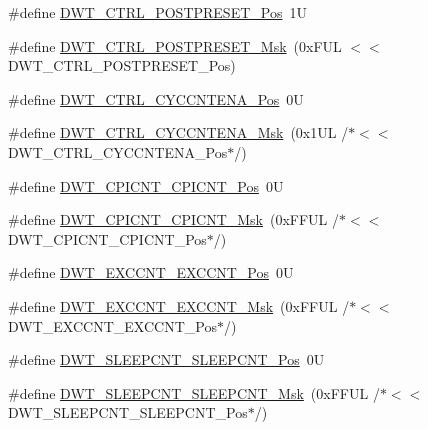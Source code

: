 \begin{DoxyCompactItemize}
\item 
\#define \hyperlink{group___c_m_s_i_s___d_w_t_ga129bc152febfddd67a0c20c6814cba69}{D\-W\-T\-\_\-\-C\-T\-R\-L\-\_\-\-P\-O\-S\-T\-P\-R\-E\-S\-E\-T\-\_\-\-Pos}~1\-U
\item 
\#define \hyperlink{group___c_m_s_i_s___d_w_t_ga11d9e1e2a758fdd2657aa68ce61b9c9d}{D\-W\-T\-\_\-\-C\-T\-R\-L\-\_\-\-P\-O\-S\-T\-P\-R\-E\-S\-E\-T\-\_\-\-Msk}~(0x\-F\-U\-L $<$$<$ D\-W\-T\-\_\-\-C\-T\-R\-L\-\_\-\-P\-O\-S\-T\-P\-R\-E\-S\-E\-T\-\_\-\-Pos)
\item 
\#define \hyperlink{group___c_m_s_i_s___d_w_t_gaa4509f5f8514a7200be61691f0e01f10}{D\-W\-T\-\_\-\-C\-T\-R\-L\-\_\-\-C\-Y\-C\-C\-N\-T\-E\-N\-A\-\_\-\-Pos}~0\-U
\item 
\#define \hyperlink{group___c_m_s_i_s___d_w_t_ga4a9d209dc2a81ea6bfa0ea21331769d3}{D\-W\-T\-\_\-\-C\-T\-R\-L\-\_\-\-C\-Y\-C\-C\-N\-T\-E\-N\-A\-\_\-\-Msk}~(0x1\-U\-L /$\ast$$<$$<$ D\-W\-T\-\_\-\-C\-T\-R\-L\-\_\-\-C\-Y\-C\-C\-N\-T\-E\-N\-A\-\_\-\-Pos$\ast$/)
\item 
\#define \hyperlink{group___c_m_s_i_s___d_w_t_ga80e9ad8f6a9e2344af8a3cf989bebe3d}{D\-W\-T\-\_\-\-C\-P\-I\-C\-N\-T\-\_\-\-C\-P\-I\-C\-N\-T\-\_\-\-Pos}~0\-U
\item 
\#define \hyperlink{group___c_m_s_i_s___d_w_t_ga76f39e7bca3fa86a4dbf7b8f6adb7217}{D\-W\-T\-\_\-\-C\-P\-I\-C\-N\-T\-\_\-\-C\-P\-I\-C\-N\-T\-\_\-\-Msk}~(0x\-F\-F\-U\-L /$\ast$$<$$<$ D\-W\-T\-\_\-\-C\-P\-I\-C\-N\-T\-\_\-\-C\-P\-I\-C\-N\-T\-\_\-\-Pos$\ast$/)
\item 
\#define \hyperlink{group___c_m_s_i_s___d_w_t_ga031c693654030d4cba398b45d2925b1d}{D\-W\-T\-\_\-\-E\-X\-C\-C\-N\-T\-\_\-\-E\-X\-C\-C\-N\-T\-\_\-\-Pos}~0\-U
\item 
\#define \hyperlink{group___c_m_s_i_s___d_w_t_ga057fa604a107b58a198bbbadb47e69c9}{D\-W\-T\-\_\-\-E\-X\-C\-C\-N\-T\-\_\-\-E\-X\-C\-C\-N\-T\-\_\-\-Msk}~(0x\-F\-F\-U\-L /$\ast$$<$$<$ D\-W\-T\-\_\-\-E\-X\-C\-C\-N\-T\-\_\-\-E\-X\-C\-C\-N\-T\-\_\-\-Pos$\ast$/)
\item 
\#define \hyperlink{group___c_m_s_i_s___d_w_t_ga0371a84a7996dc5852c56afb2676ba1c}{D\-W\-T\-\_\-\-S\-L\-E\-E\-P\-C\-N\-T\-\_\-\-S\-L\-E\-E\-P\-C\-N\-T\-\_\-\-Pos}~0\-U
\item 
\#define \hyperlink{group___c_m_s_i_s___d_w_t_ga1e340751d71413fef400a0a1d76cc828}{D\-W\-T\-\_\-\-S\-L\-E\-E\-P\-C\-N\-T\-\_\-\-S\-L\-E\-E\-P\-C\-N\-T\-\_\-\-Msk}~(0x\-F\-F\-U\-L /$\ast$$<$$<$ D\-W\-T\-\_\-\-S\-L\-E\-E\-P\-C\-N\-T\-\_\-\-S\-L\-E\-E\-P\-C\-N\-T\-\_\-\-Pos$\ast$/)
\item 
$$
\end{DoxyCompactItemize}

